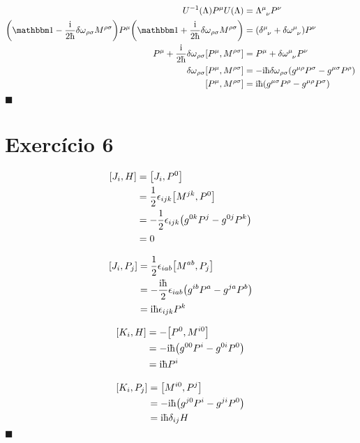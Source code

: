 \documentclass[twoside]{amsart}
\newcommand{\cqd}{\hfill$\blacksquare$}
\numberwithin{equation}{section}
\begin{document}
\begin{align*}
    U^{-1}\qty(\Lambda)P^\mu U\qty(\Lambda)&=\tensor{\Lambda}{^\mu_\nu}P^\nu\\
    \qty(\mathbbm 1-\frac{\im}{2\hbar}{\delta\omega}_{\rho\sigma}M^{\rho\sigma})P^\mu\qty(\mathbbm 1+\frac{\im}{2\hbar}{\delta\omega}_{\rho\sigma}M^{\rho\sigma})&=\qty(\tensor{\delta}{^\mu_\nu}+\tensor{\delta\omega}{^\mu_\nu})P^\nu\\
    P^\mu+\frac{\im}{2\hbar}{\delta\omega}_{\rho\sigma}\comm{P^\mu}{M^{\rho\sigma}}&=P^\mu+\tensor{\delta\omega}{^\mu_\nu}P^\nu\\
    {\delta\omega}_{\rho\sigma}\comm{P^\mu}{M^{\rho\sigma}}&=-\im\hbar{\delta\omega}_{\rho\sigma}\qty(g^{\mu\rho}P^\sigma-g^{\mu\sigma}P^\rho)\\
    \comm{P^\mu}{M^{\rho\sigma}}&=\im\hbar\qty(g^{\mu\sigma}P^\rho-g^{\mu\rho}P^\sigma)
\end{align*}
\cqd


\section{Exercício 6}

\begin{align*}
    \comm{J_i}{H}&=\comm{J_i}{P^0}\\
    &=\frac12\epsilon_{ijk}\comm{M^{jk}}{P^0}\\
    &=-\frac12\epsilon_{ijk}\qty(g^{0k}P^j-g^{0j}P^k)\\
    &=0
\end{align*}

\begin{align*}
    \comm{J_i}{P_j}&=\frac12\epsilon_{iab}\comm{M^{ab}}{P_j}\\
    &=-\frac{\im\hbar}{2}\epsilon_{iab}\qty(g^{ib}P^a-g^{ja}P^b)\\
    &=\im\hbar\epsilon_{ijk}P^k
\end{align*}

\begin{align*}
    \comm{K_i}{H}&=-\comm{P^0}{M^{i0}}\\
    &=-\im\hbar\qty(g^{00}P^i-g^{0i}P^0)\\
    &=\im\hbar P^i
\end{align*}

\begin{align*}
    \comm{K_i}{P_j}&=\comm{M^{i0}}{P^j}\\
    &=-\im\hbar\qty(g^{j0}P^i-g^{ji}P^0)\\
    &=\im\hbar\delta_{ij}H
\end{align*}
\cqd
\end{document}
